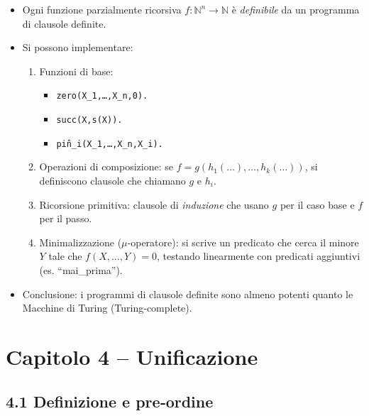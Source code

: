 \documentclass[12pt]{article}
\begin{document}
\begin{itemize}
  \item Ogni funzione parzialmente ricorsiva $f: \mathbb{N}^n \to \mathbb{N}$ è \emph{definibile} da un programma di clausole definite.
  \item Si possono implementare:
    \begin{enumerate}
      \item Funzioni di base:
        \begin{itemize}
          \item \texttt{zero(X\_1,…,X\_n,0).}
          \item \texttt{succ(X,s(X)).}
          \item \texttt{pi\^n\_i(X\_1,…,X\_n,X\_i).}
        \end{itemize}
      \item Operazioni di composizione: se $f = g(h_1(\dots),\dots,h_k(\dots))$, si definiscono clausole che chiamano $g$ e $h_i$.
      \item Ricorsione primitiva: clausole di \emph{induzione} che usano $g$ per il caso base e $f$ per il passo.
      \item Minimalizzazione ($\mu$‐operatore): si scrive un predicato che cerca il minore $Y$ tale che $f(X,\dots,Y)=0$, testando linearmente con predicati aggiuntivi (es. ``mai\_prima'').
    \end{enumerate}
  \item Conclusione: i programmi di clausole definite sono almeno potenti quanto le Macchine di Turing (Turing‐complete).
\end{itemize}

\section*{Capitolo 4 – Unificazione}

\subsection*{4.1 Definizione e pre‐ordine}
\end{document}
